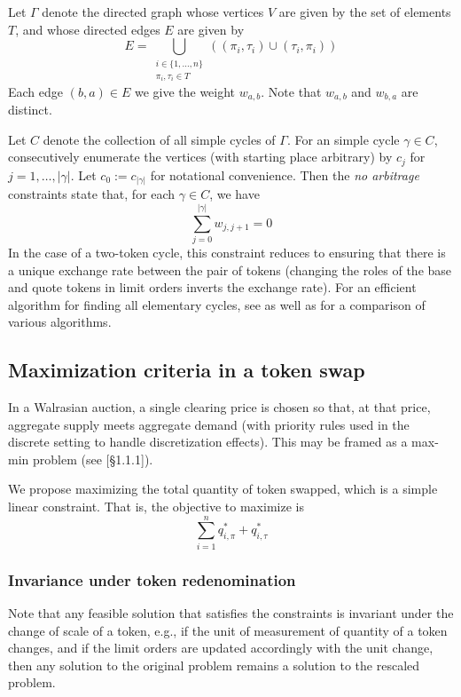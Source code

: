 \documentclass[11pt, reqno]{amsart}
\theoremstyle{definition}
\theoremstyle{remark}
\begin{document}
Let $\Gamma$ denote the directed graph whose vertices $V$ are given by the set
of elements $T$, and whose directed edges $E$ are given by
\[
    E = \bigcup_{\substack{i \in \{1, \ldots, n\} \\ \pi_i, \tau_i \in T}}
    \left( (\pi_i, \tau_i) \cup (\tau_i, \pi_i) \right)
\]
Each edge $(b, a) \in E$ we give the weight $w_{a, b}$. Note that
$w_{a, b}$ and $w_{b, a}$ are distinct.

Let $C$ denote the collection of all simple cycles of $\Gamma$.
For an simple cycle $\gamma \in C$, consecutively enumerate the vertices
(with starting place arbitrary) by $c_j$ for $j = 1, \ldots, |\gamma|$.
Let $c_0 := c_{|\gamma|}$ for notational convenience. Then
the \emph{no arbitrage} constraints state that, for each $\gamma \in C$, we have
\[
    \sum_{j = 0}^{|\gamma|} w_{j, j + 1} = 0
\]
In the case of a two-token cycle, this constraint reduces to ensuring that
there is a unique exchange rate between the pair of tokens (changing the roles
of the base and quote tokens in limit orders inverts the exchange rate).
For an efficient algorithm for finding all elementary cycles, see \cite{Jo75}
as well as \cite{MaDe76} for a comparison of various algorithms.

\subsection{Maximization criteria in a token swap}

In a Walrasian auction, a single clearing price is chosen so that, at that
price, aggregate supply meets aggregate demand (with priority rules used in
the discrete setting to handle discretization effects). This may be framed
as a max-min problem (see \cite{BoBoDoGo18}[\S 1.1.1]).

We propose maximizing the total quantity of token swapped, which is a simple
linear constraint. That is, the objective to maximize is
\begin{equation}\label{objective_function}
\sum_{i = 1}^n q_{i, \pi}^* + q_{i, \tau}^*
\end{equation}

\subsubsection{Invariance under token redenomination}
Note that any feasible solution that satisfies the constraints is invariant
under the change of scale of a token, e.g., if the unit of measurement of
quantity of a token changes, and if the limit orders are updated accordingly
with the unit change, then any solution to the original problem remains a
solution to the rescaled problem.
\end{document}
